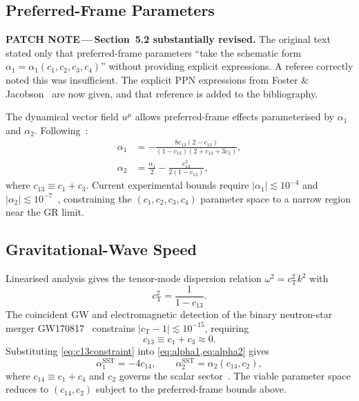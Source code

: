 \documentclass[12pt,a4paper]{article}
\newcommand{\patchnote}[1]{%
  \begin{patchbox}
    {\small\color{patchtext}\textbf{PATCH NOTE\,---\,}#1}
  \end{patchbox}}
\newcommand{\cT}{c_{\mathrm{T}}}
\begin{document}
\subsection{Preferred-Frame Parameters}

\patchnote{\textbf{Section~5.2 substantially revised.}
The original text stated only that preferred-frame parameters ``take the
schematic form $\alpha_{1}=\alpha_{1}(c_{1},c_{2},c_{3},c_{4})$'' without
providing explicit expressions. A referee correctly noted this was
insufficient. The explicit PPN expressions from Foster \&
Jacobson~\citep{foster2006} are now given, and that reference is added to the
bibliography.}

The dynamical vector field $u^{\mu}$ allows preferred-frame effects
parameterised by $\alpha_{1}$ and $\alpha_{2}$. Following~\citet{foster2006}:
\begin{align}
  \alpha_{1} &= -\frac{8c_{13}(2-c_{13})}{(1-c_{13})(2+c_{13}+3c_{2})},
  \label{eq:alpha1}\\[4pt]
  \alpha_{2} &= \frac{\alpha_{1}}{2}
               -\frac{c_{13}^{2}}{2(1-c_{13})},
  \label{eq:alpha2}
\end{align}
where $c_{13}\equiv c_{1}+c_{3}$. Current experimental bounds require
$|\alpha_{1}|\lesssim 10^{-4}$ and $|\alpha_{2}|\lesssim
10^{-7}$~\citep{will2014}, constraining the $(c_{1},c_{2},c_{3},c_{4})$
parameter space to a narrow region near the GR limit.

\subsection{Gravitational-Wave Speed}

Linearised analysis gives the tensor-mode dispersion relation
$\omega^{2}=\cT^{2}k^{2}$ with
\begin{equation}
  \cT^{2}=\frac{1}{1-c_{13}}.
  \label{eq:cT}
\end{equation}
The coincident GW and electromagnetic detection of the binary neutron-star
merger GW170817~\citep{abbott2017gw,abbott2017mm} constrains
$|\cT-1|\lesssim 10^{-15}$, requiring
\begin{equation}
  c_{13}\equiv c_{1}+c_{3}\approx 0.
  \label{eq:c13constraint}
\end{equation}
Substituting \cref{eq:c13constraint} into \cref{eq:alpha1,eq:alpha2} gives
\begin{equation}
  \alpha_{1}^{\mathrm{SST}}=-4c_{14},\qquad
  \alpha_{2}^{\mathrm{SST}}=\alpha_{2}(c_{14},c_{2}),
\end{equation}
where $c_{14}\equiv c_{1}+c_{4}$ and $c_{2}$ governs the scalar
sector~\citep{foster2006}. The viable parameter space reduces to $(c_{14},
c_{2})$ subject to the preferred-frame bounds above.
\end{document}
